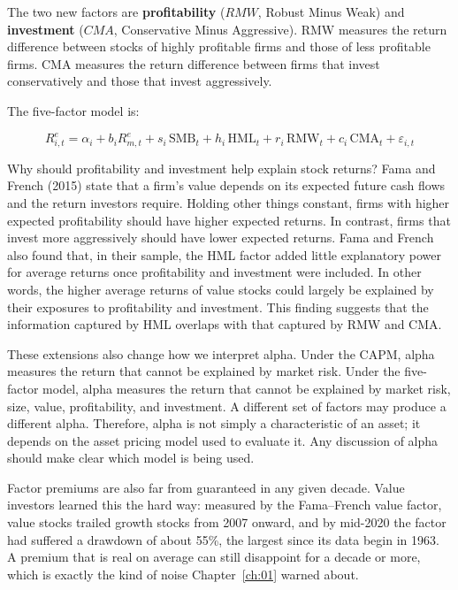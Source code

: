 The two new factors are \textbf{profitability}  ($RMW$, Robust Minus Weak) and
\textbf{investment} ($CMA$, Conservative Minus Aggressive). RMW measures the return difference between stocks of
highly profitable firms and those of less profitable firms. CMA measures the return difference between firms that invest conservatively
and those that invest aggressively. 

The five-factor model is:

\begin{equation}
  R^{e}_{i,t} = \alpha_i + b_i R^{e}_{m,t} + s_i \,\mathrm{SMB}_t + h_i \,\mathrm{HML}_t + r_i \,\mathrm{RMW}_t + c_i \,\mathrm{CMA}_t + \varepsilon_{i,t}
  \label{eq:04-ff5}
\end{equation}

Why should profitability and investment help explain stock returns? Fama and French (2015) state that a firm's value depends on its expected future cash flows and the return investors require.
Holding other things constant, firms with higher expected profitability should have higher expected returns. In contrast, firms that invest
more aggressively should have lower expected returns. 
Fama and French also found that, in their sample, the
HML factor added little explanatory power for average returns once profitability and investment were included. In other words, the
higher average returns of value stocks could largely be explained by their exposures to profitability and investment. This finding suggests
that the information captured by HML overlaps with that captured by RMW and CMA.

These extensions also change how we interpret alpha. Under the CAPM, alpha measures the return that cannot be explained by market risk.
Under the five-factor model, alpha measures the return that cannot be explained by market risk, size, value, profitability, and investment.
A different set of factors may produce a different alpha. Therefore, alpha is not simply a characteristic of an asset; it depends on the
asset pricing model used to evaluate it. Any discussion of alpha should make clear which model is being used.

Factor premiums are also far from guaranteed in any given decade. Value investors learned this the hard way: measured by the Fama--French value factor, value stocks trailed growth stocks from 2007 onward, and by mid-2020 the factor had suffered a drawdown of about 55\%, the largest since its data begin in 1963. A premium that is real on average can still disappoint for a decade or more, which is exactly the kind of noise Chapter~\ref{ch:01} warned about.


